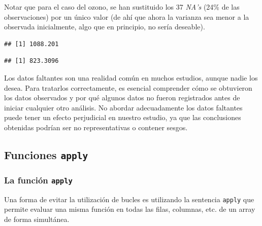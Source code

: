 \documentclass[
]{book}
\newenvironment{Shaded}{\begin{snugshade}}{\end{snugshade}}
\newcommand{\AttributeTok}[1]{\textcolor[rgb]{0.13,0.29,0.53}{#1}}
\newcommand{\FunctionTok}[1]{\textcolor[rgb]{0.13,0.29,0.53}{\textbf{#1}}}
\newcommand{\NormalTok}[1]{#1}
\newcommand{\SpecialCharTok}[1]{\textcolor[rgb]{0.81,0.36,0.00}{\textbf{#1}}}
\begin{document}
Notar que para el caso del ozono, se han sustituido los 37 \emph{NA's} (24\% de las observaciones) por un único valor (de ahí que ahora la varianza sea menor a la observada inicialmente, algo que en principio, no sería deseable).

\begin{Shaded}
\end{Shaded}

\begin{verbatim}
## [1] 1088.201
\end{verbatim}

\begin{Shaded}
\end{Shaded}

\begin{verbatim}
## [1] 823.3096
\end{verbatim}

Los datos faltantes son una realidad común en muchos estudios, aunque nadie los desea. Para tratarlos correctamente, es esencial comprender cómo se obtuvieron los datos observados y por qué algunos datos no fueron registrados antes de iniciar cualquier otro análisis. No abordar adecuadamente los datos faltantes puede tener un efecto perjudicial en nuestro estudio, ya que las conclusiones obtenidas podrían ser no representativas o contener sesgos.

\subsection{\texorpdfstring{Funciones \texttt{apply}}{Funciones apply}}\label{funciones-apply}

\subsubsection{\texorpdfstring{La función \texttt{apply}}{La función apply}}\label{la-funciuxf3n-apply}

Una forma de evitar la utilización de bucles es utilizando la sentencia \texttt{apply} que permite evaluar una misma función en todas las filas, columnas, etc. de un array de forma simultánea.
\end{document}
